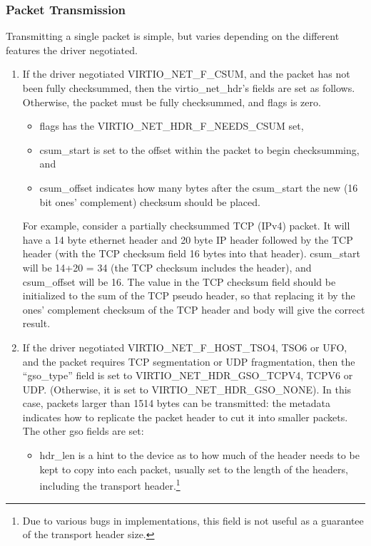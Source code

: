 \subsubsection{Packet Transmission}\label{sec:Device Types / Network Device / Device Operation / Packet Transmission}

Transmitting a single packet is simple, but varies depending on
the different features the driver negotiated.

\begin{enumerate}
\item If the driver negotiated VIRTIO_NET_F_CSUM, and the packet has
  not been fully checksummed, then the virtio_net_hdr's fields
  are set as follows. Otherwise, the packet must be fully
  checksummed, and flags is zero.
  \begin{itemize}
  \item flags has the VIRTIO_NET_HDR_F_NEEDS_CSUM set,

  \item csum_start is set to the offset within the packet to begin checksumming,
    and

  \item csum_offset indicates how many bytes after the csum_start the
    new (16 bit ones' complement) checksum should be placed.
  \end{itemize}

For example, consider a partially checksummed TCP (IPv4) packet.
It will have a 14 byte ethernet header and 20 byte IP header
followed by the TCP header (with the TCP checksum field 16 bytes
into that header). csum_start will be 14+20 = 34 (the TCP
checksum includes the header), and csum_offset will be 16. The
value in the TCP checksum field should be initialized to the sum
of the TCP pseudo header, so that replacing it by the ones'
complement checksum of the TCP header and body will give the
correct result.

\item If the driver negotiated
  VIRTIO_NET_F_HOST_TSO4, TSO6 or UFO, and the packet requires
  TCP segmentation or UDP fragmentation, then the “gso_type”
  field is set to VIRTIO_NET_HDR_GSO_TCPV4, TCPV6 or UDP.
  (Otherwise, it is set to VIRTIO_NET_HDR_GSO_NONE). In this
  case, packets larger than 1514 bytes can be transmitted: the
  metadata indicates how to replicate the packet header to cut it
  into smaller packets. The other gso fields are set:

  \begin{itemize}
  \item hdr_len is a hint to the device as to how much of the header
    needs to be kept to copy into each packet, usually set to the
    length of the headers, including the transport header.\footnote{Due to various bugs in implementations, this field is not useful
as a guarantee of the transport header size.
}


\end{itemize}
\end{enumerate}
